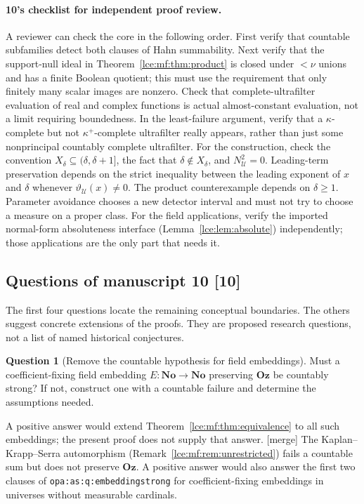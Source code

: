 \documentclass[11pt,letterpaper]{article}
\numberwithin{equation}{section}
\theoremstyle{definition}
\newtheorem{question}[theorem]{Question}
\theoremstyle{remark}
\newcommand{\No}{\mathbf{No}}
\newcommand{\Oz}{\mathbf{Oz}}
\newcommand{\thref}[1]{Theorem~\ref{#1}}
\newcommand{\leref}[1]{Lemma~\ref{#1}}
\newcommand{\src}[1]{\textup{\textsf{\small[#1]}}}%
\newcommand{\mergetag}{\textup{\textsf{\small[merge]}}}%
\newcommand{\lbl}[1]{\nolinkurl{#1}}%
\begin{document}
\paragraph{10's checklist for independent proof review.} A reviewer can
check the core in the following order. First verify that countable
subfamilies detect both clauses of Hahn summability. Next verify that the
support-null ideal in \thref{lce:mf:thm:product} is closed under ${<}\nu$
unions and has a finite Boolean quotient; this must use the requirement that
only finitely many scalar images are nonzero. Check that complete-ultrafilter
evaluation of real and complex functions is actual almost-constant
evaluation, not a limit requiring boundedness. In the least-failure
argument, verify that a $\kappa$-complete but not $\kappa^+$-complete
ultrafilter really appears, rather than just some nonprincipal countably
complete ultrafilter. For the construction, check the convention
$X_\delta\subseteq(\delta,\delta+1]$, the fact that $\delta\notin X_\delta$,
and $N_{\mathcal U}^2=0$. Leading-term preservation depends on the strict
inequality between the leading exponent of $x$ and $\delta$ whenever
$\vartheta_{\mathcal U}(x)\ne0$. The product counterexample depends on
$\delta\ge1$. Parameter avoidance chooses a new detector interval and must
not try to choose a measure on a proper class. For the field applications,
verify the imported normal-form absoluteness interface
(\leref{lce:lem:absolute}) independently; those applications are the only
part that needs it.

\subsection{Questions of manuscript 10 \src{10}}
The first four questions locate the remaining conceptual boundaries. The
others suggest concrete extensions of the proofs. They are proposed research
questions, not a list of named historical conjectures.

\begin{question}[Remove the countable hypothesis for field embeddings]\label{lce:mf:q:countable}
Must a coefficient-fixing field embedding $E:\No\to\No$ preserving $\Oz$ be
countably strong? If not, construct one with a countable failure and
determine the assumptions needed.
\end{question}
A positive answer would extend \thref{lce:mf:thm:equivalence} to all such
embeddings; the present proof does not supply that answer. \mergetag{} The
Kaplan--Krapp--Serra automorphism (Remark~\ref{lce:mf:rem:unrestricted})
fails a countable sum but does not preserve $\Oz$. A positive answer would
also answer the first two clauses of \lbl{opa:as:q:embeddingstrong} for
coefficient-fixing embeddings in universes without measurable cardinals.
\end{document}
